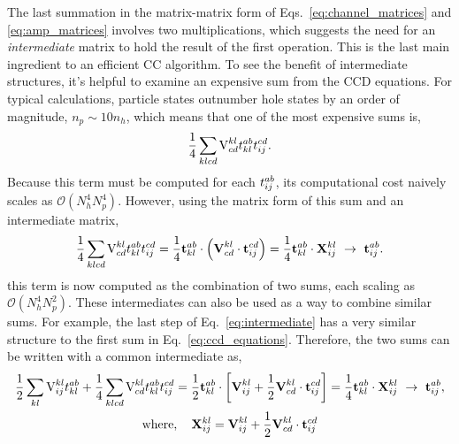 \documentclass[thesis.tex]{subfiles}
\begin{document}
The last summation in the matrix-matrix form of Eqs.\ \eqref{eq:channel_matrices} and \eqref{eq:amp_matrices} involves two multiplications, which suggests the need for an \textit{intermediate} matrix to hold the result of the first operation.  This is the last main ingredient to an efficient CC algorithm.  To see the benefit of intermediate structures, it's helpful to examine an expensive sum from the CCD equations.  For typical calculations, particle states outnumber hole states by an order of magnitude, $n_{p} \sim 10n_{h}$, which means that one of the most expensive sums is,
\begin{equation}
  \frac{1}{4}\sum\limits_{\mathclap{klcd}}\vint{kl}{cd}\tamp{ab}{kl}\tamp{cd}{ij}.
\end{equation}
Because this term must be computed for each $t^{ab}_{ij}$, its computational cost naively scales as $\mathcal{O}\left( N_{h}^{4}N_{p}^{4}\right)$.  However, using the matrix form of this sum and an intermediate matrix,
\begin{equation} \label{eq:intermediate}
  \frac{1}{4}\sum\limits_{\mathclap{klcd}}\vint{kl}{cd}\tamp{ab}{kl}\tamp{cd}{ij} = \frac{1}{4}\btamp{ab}{kl}\cdot\left(\bvint{kl}{cd}\cdot\btamp{cd}{ij}\right) = \frac{1}{4}\btamp{ab}{kl}\cdot\bxint{kl}{ij}\ \rightarrow\ \btamp{ab}{ij}.
\end{equation}
this term is now computed as the combination of two sums, each scaling as $\mathcal{O}\left( N_{h}^{4}N_{p}^{2}\right)$.  These intermediates can also be used as a way to combine similar sums.  For example, the last step of Eq.\ \ref{eq:intermediate} has a very similar structure to the first sum in Eq.\ \ref{eq:ccd_equations}.  Therefore, the two sums can be written with a common intermediate as,
\begin{gather}
  \frac{1}{2}\sum\limits_{\mathclap{kl}}\vint{kl}{ij}\tamp{ab}{kl} + \frac{1}{4}\sum\limits_{\mathclap{klcd}}\vint{kl}{cd}\tamp{ab}{kl}\tamp{cd}{ij} = \frac{1}{2}\btamp{ab}{kl}\cdot\left[ \bvint{kl}{ij} + \frac{1}{2}\bvint{kl}{cd}\cdot\btamp{cd}{ij} \right] = \frac{1}{4}\btamp{ab}{kl}\cdot\bxint{kl}{ij}\ \rightarrow\ \btamp{ab}{ij}, \notag \\
  \text{where},\hspace{10pt} \bxint{kl}{ij} = \bvint{kl}{ij} + \frac{1}{2}\bvint{kl}{cd}\cdot\btamp{cd}{ij}
\end{gather}
\end{document}
